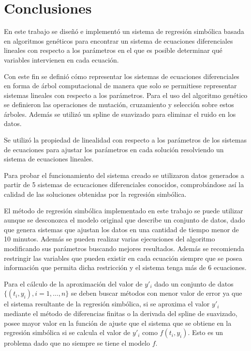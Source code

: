 \chapter*{Conclusiones}\label{chapter:conclusions}

En este trabajo se diseñó e implementó un sistema de regresión simbólica basada en algoritmos genéticos para encontrar un sistema de ecuaciones diferenciales lineales con respecto a los parámetros en el que es posible determinar qué variables intervienen en cada ecuación.

Con este fin se definió cómo representar los sistemas de ecuaciones diferenciales en forma de árbol computacional de manera que solo se permitiese representar sistemas lineales con respecto a los parámetros. Para el uso del algoritmo genético se definieron las operaciones de mutación, cruzamiento y selección sobre estos árboles. Además se utilizó un spline de suavizado para eliminar el ruido en los datos.

Se utilizó la propiedad de linealidad con respecto a los parámetros de los sistemas de ecuaciones para ajustar los parámetros en cada solución resolviendo un sistema de ecuaciones lineales.

Para probar el funcionamiento del sistema creado se utilizaron datos generados a partir de 5 sistemas de ecucaciones diferenciales conocidos, comprobándose así la calidad de las soluciones obtenidas por la regresión simbólica.

El método de regresión simbólica implementado en este trabajo se puede utilizar aunque se desconozca el modelo original que describe un conjunto de datos, dado que genera sistemas que ajustan los datos en una cantidad de tiempo menor de 10 minutos. Además se pueden realizar varias ejecuciones del algoritmo modificando sus parámetros buscando mejores resultados. Además se recomienda restringir las variables que pueden existir en cada ecuación siempre que se posea información que permita dicha restricción y el sistema tenga más de 6 ecuaciones.

Para el cálculo de la aproximación del valor de $y'_i$ dado un conjunto de datos $\{(t_i, y_i), i=1, \dots, n\}$ se deben buscar métodos con menor valor de error ya que el sistema resultante de la regresión simbólica, si se aproxima el valor $y'_i$ mediante el método de diferencias finitas o la derivada del spline de suavizado, posee mayor valor en la función de ajuste que el sistema que se obtiene en la regresión simbólica si se calcula el valor de $y'_i$ como $f(t_i, y_i)$. Esto es un problema dado que no siempre se tiene el modelo $f$.


